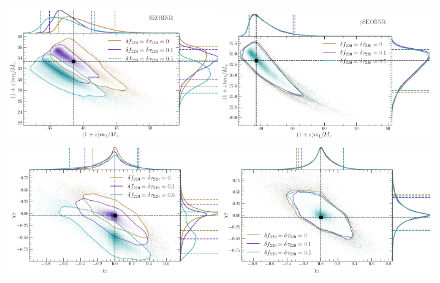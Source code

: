\begin{figure}%
        \includegraphics[width=0.5\textwidth]{figures/GW150914_simulated_signal_0p0_0p1_0p5_gr_m1m2.png}\includegraphics[width=0.5\textwidth]{figures/GW150914_simulated_signal_0p0_0p1_0p5_ngr_m1m2.png}
        \includegraphics[width=0.5\textwidth]{figures/GW150914_simulated_signal_0p0_0p1_0p5_gr_a1za2z.png}\includegraphics[width=0.5\textwidth]{figures/GW150914_simulated_signal_0p0_0p1_0p5_ngr_a1za2z.png}

\end{figure}
